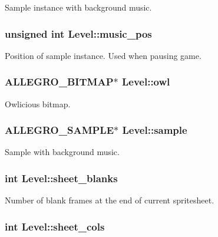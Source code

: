 Sample instance with background music. \hypertarget{structLevel_a13e322deb3298846260af31324e5b492}{
\subsubsection[{music\-\_\-pos}]{\setlength{\rightskip}{0pt plus 5cm}unsigned int Level\-::music\-\_\-pos}}\label{structLevel_a13e322deb3298846260af31324e5b492}
Position of sample instance. Used when pausing game. \hypertarget{structLevel_af504e3f628040bc2a2913a50253e856d}{
\subsubsection[{owl}]{\setlength{\rightskip}{0pt plus 5cm}A\-L\-L\-E\-G\-R\-O\-\_\-\-B\-I\-T\-M\-A\-P$\ast$ Level\-::owl}}\label{structLevel_af504e3f628040bc2a2913a50253e856d}
Owlicious bitmap. \hypertarget{structLevel_a234fa7b9ec35dd360e4e3c48a944fc7d}{
\subsubsection[{sample}]{\setlength{\rightskip}{0pt plus 5cm}A\-L\-L\-E\-G\-R\-O\-\_\-\-S\-A\-M\-P\-L\-E$\ast$ Level\-::sample}}\label{structLevel_a234fa7b9ec35dd360e4e3c48a944fc7d}
Sample with background music. \hypertarget{structLevel_aebaaba311e5d4842fdbd8c50edd40808}{
\subsubsection[{sheet\-\_\-blanks}]{\setlength{\rightskip}{0pt plus 5cm}int Level\-::sheet\-\_\-blanks}}\label{structLevel_aebaaba311e5d4842fdbd8c50edd40808}
Number of blank frames at the end of current spritesheet. \hypertarget{structLevel_a8a5c443169a4ff15f330a65473eedb1b}{
\subsubsection[{sheet\-\_\-cols}]{\setlength{\rightskip}{0pt plus 5cm}int Level\-::sheet\-\_\-cols}}\label{structLevel_a8a5c443169a4ff15f330a65473eedb1b}
